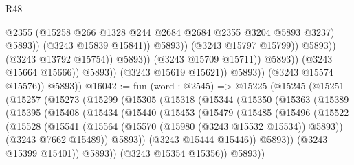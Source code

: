 \begin{lexlean}{R48}
\begin{coremodule}
                                                  @2355
                                                  (@15258
                                                    @266
                                                    @1328
                                                    @244
                                                    @2684
                                                    @2684
                                                    @2355
                                                    @3204
                                                    @5893
                                                    @3237)
                                                  @5893))
                                              (@3243 @15839 @15841))
                                            @5893))
                                        (@3243 @15797 @15799))
                                      @5893))
                                  (@3243 @13792 @15754))
                                @5893))
                            (@3243 @15709 @15711))
                          @5893))
                      (@3243 @15664 @15666))
                    @5893))
                (@3243 @15619 @15621))
              @5893))
          (@3243 @15574 @15576))
        @5893))
@16042 := fun (word : @2545) =>
  @15225
    (@15245
      (@15251
        (@15257
          (@15273
            (@15299
              (@15305
                (@15318
                  (@15344
                    (@15350
                      (@15363
                        (@15389
                          (@15395
                            (@15408
                              (@15434
                                (@15440
                                  (@15453
                                    (@15479
                                      (@15485
                                        (@15496
                                          (@15522
                                            (@15528
                                              (@15541
                                                (@15564
                                                  (@15570 (@15980 (@3243 @15532 @15534)) @5893))
                                                (@3243 @7662 @15489))
                                              @5893))
                                          (@3243 @15444 @15446))
                                        @5893))
                                    (@3243 @15399 @15401))
                                  @5893))
                              (@3243 @15354 @15356))
                            @5893))

\end{coremodule}
\end{lexlean}
